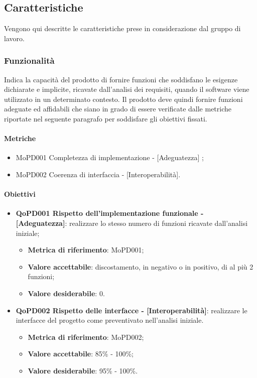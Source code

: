 \documentclass[../piano-di-qualifica.tex]{subfiles}
\begin{document}
\subsection{Caratteristiche}%
\label{sub:caratteristiche}
Vengono qui descritte le caratteristiche prese in considerazione dal gruppo di lavoro.

\subsubsection{Funzionalità}%
\label{sub:funzionalita}
Indica la capacità del prodotto di fornire funzioni che soddisfano le esigenze dichiarate e implicite, ricavate dall'analisi dei requisiti, quando il software viene utilizzato in un determinato contesto.
Il prodotto deve quindi fornire funzioni adeguate ed affidabili che siano in grado di essere verificate dalle metriche riportate nel seguente paragrafo per soddisfare gli obiettivi fissati.

\paragraph{Metriche}
\label{sub:metriche}
\begin{itemize}
    \item MoPD001 Completezza di implementazione - [Adeguatezza] ;
    \item MoPD002 Coerenza di interfaccia - [Interoperabilità].
\end{itemize}

\paragraph{Obiettivi}
\label{sub:obiettivi}
\begin{itemize}
    \item \textbf{QoPD001 Rispetto dell'implementazione funzionale - [Adeguatezza]}: realizzare lo stesso numero di funzioni ricavate dall'analisi iniziale;
        \begin{itemize}
            \item \textbf{Metrica di riferimento}: MoPD001;
            \item \textbf{Valore accettabile}: discostamento, in negativo o in positivo, di al più 2 funzioni;
            \item \textbf{Valore desiderabile}: 0.
        \end{itemize}
    \item \textbf{QoPD002 Rispetto delle interfacce - [Interoperabilità]}: realizzare le interfacce del progetto come preventivato nell'analisi iniziale.
        \begin{itemize}
            \item \textbf{Metrica di riferimento}: MoPD002;
            \item \textbf{Valore accettabile}: 85\% - 100\%;
            \item \textbf{Valore desiderabile}: 95\% - 100\%.
        \end{itemize}
\end{itemize}
\end{document}
